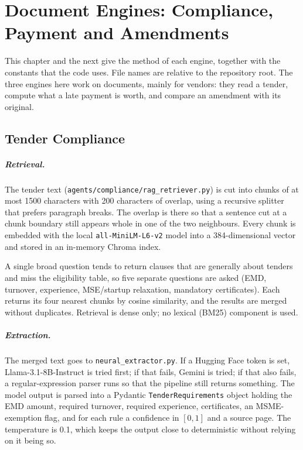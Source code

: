 \chapter{Document Engines: Compliance, Payment and Amendments}
\label{ch:engines1}

This chapter and the next give the method of each engine, together with the constants that the code uses. File names are relative to the repository root. The three engines here work on documents, mainly for vendors: they read a tender, compute what a late payment is worth, and compare an amendment with its original.

\section{Tender Compliance}
\label{sec:compliance}

\paragraph{Retrieval.} The tender text (\texttt{agents/compliance/rag\_retriever.py}) is cut into chunks of at most 1500 characters with 200 characters of overlap, using a recursive splitter that prefers paragraph breaks. The overlap is there so that a sentence cut at a chunk boundary still appears whole in one of the two neighbours. Every chunk is embedded with the local \texttt{all-MiniLM-L6-v2} model into a 384-dimensional vector and stored in an in-memory Chroma index.

A single broad question tends to return clauses that are generally about tenders and miss the eligibility table, so five separate questions are asked (EMD, turnover, experience, MSE/startup relaxation, mandatory certificates). Each returns its four nearest chunks by cosine similarity, and the results are merged without duplicates. Retrieval is dense only; no lexical (BM25) component is used.

\paragraph{Extraction.} The merged text goes to \texttt{neural\_extractor.py}. If a Hugging Face token is set, Llama-3.1-8B-Instruct is tried first; if that fails, Gemini is tried; if that also fails, a regular-expression parser runs so that the pipeline still returns something. The model output is parsed into a Pydantic \texttt{TenderRequirements} object holding the EMD amount, required turnover, required experience, certificates, an MSME-exemption flag, and for each rule a confidence in $[0,1]$ and a source page. The temperature is 0.1, which keeps the output close to deterministic without relying on it being so.

